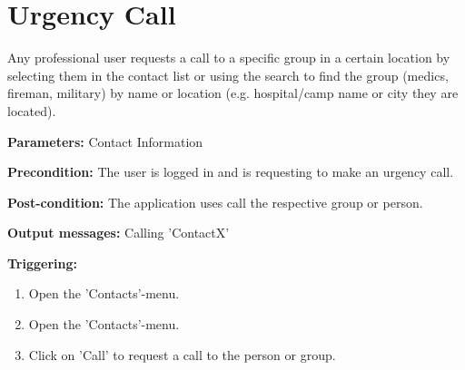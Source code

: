 \section{Urgency Call}
\label{operation:UrgencyCall}
Any professional user requests a call to a specific group in a certain location by selecting 
them in the contact list or using the search to find the group (medics, fireman, military) 
by name or location (e.g. hospital/camp name or city they are located).\\

\begin{description}

\item \textbf{Parameters:} Contact Information
\item \textbf{Precondition:} The user is logged in and is requesting to make an urgency call.
\item \textbf{Post-condition:} The application uses call the respective group or person.
\item \textbf{Output messages:} Calling 'ContactX'

\item \textbf{Triggering:}
\begin{enumerate}
\item Open the 'Contacts'-menu.
\item Open the 'Contacts'-menu.
\item Click on 'Call' to request a call to the person or group.
\end{enumerate}
\end{description} 



